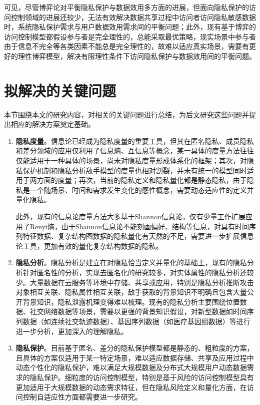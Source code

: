 可见，尽管博弈论对平衡隐私保护与数据效用多方面的进展，但面向隐私保护的访问控制领域的进展还较少，无法有效解决数据共享过程中访问者访问隐私敏感数据时，系统隐私保护需求与用户数据效用需求间的平衡问题；此外，现有基于博弈的访问控制模型都假设参与者是完全理性的，总能采取最优策略，现实场景中参与者由于信息不完全等各类因素不能总是完全理性的，故难以适应真实场景，需要有更好的理性博弈模型，解决有限理性条件下访问隐私保护与数据效用间的平衡问题。

\section{拟解决的关键问题}

本节围绕本文的研究内容，对相关的关键问题进行总结，为后文研究这些问题并提出相应的解决方案奠定基础。

\begin{enumerate}
	\item \textbf{隐私度量}。信息论已经成为隐私度量的重要工具，但其在匿名隐私、成员隐私和差分领域的应用仅利用了信息熵、互信息等概念\cite{wagner2018technical}，某一具体的度量方法往往仅能适用于一种具体的场景，尚未对隐私度量形成体系化的框架\cite{shokri2011quantifying,manousakas2018quantifying}；其次，对隐私保护机制和隐私分析敌手模型的度量也相对割裂，并未有统一的模型同时适用于两方面的度量；再次，当前的隐私定义和隐私量化都是静态隐私，由于隐私是一个随场景、时间和需求发生变化的感性概念，需要动态适应性的定义并量化隐私。
	
	此外，现有的信息论度量方法大多基于Shannon信息论，仅有少量工作扩展应用了Renyi熵，由于Shannon信息论不能刻画偏好、结构等信息，对具有时间序列特征数据、复杂结构图数据的隐私量化有天然的不足，需要进一步扩展信息论工具，更加有效的量化复杂结构数据的隐私。
	
	\item \textbf{隐私分析}。隐私分析是建立在对隐私恰当定义并量化的基础上，现有的隐私分析针对匿名性的分析，实现去匿名化的研究较多\cite{lin2009lbs,manousakas2018quantifying}，对实体属性的隐私分析还较少。大量数据在云服务等环境中存储、共享或应用，特别是隐私分析推断攻击对象相互关联、隐私属性相互关联，敌手获取的背景知识不明确且包含大量公开背景知识，隐私泄露机理变得难以梳理。现有的隐私分析主要围绕位置数据、社交网络数据等场景，需要以更强的背景知识假设，对新型数据如时间序列数据（如连续社交轨迹数据）、基因序列数据（如医疗基因组数据）等进行进一步分析，更加深入的理解隐私。
	
	\item  \textbf{隐私保护}。目前基于匿名、差分的隐私保护模型都是静态的、粗粒度的方案，且具体的方案仅适用于某一特定场景，难以适应数据存储、共享及应用过程中动态个性化的隐私保护，难以满足大规模数据及分布式大规模用户动态数据需求的隐私保护。细粒度的访问控制模型，特别是基于风险的访问控制模型具有更加适用于大规模数据的动态需求特征\cite{li2017access}，但在隐私风险定义和量化方面，在访问控制自适应性方面都需要进一步研究。
	

\end{enumerate}

